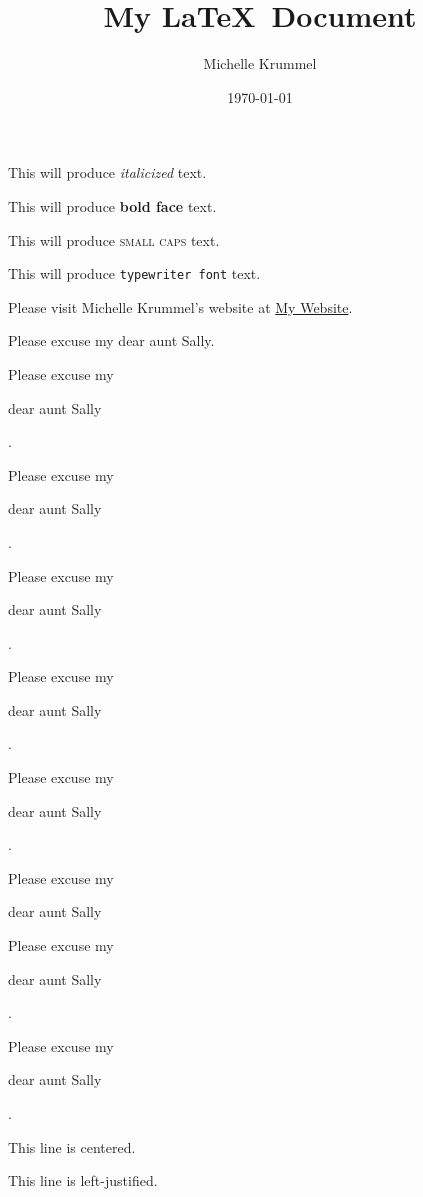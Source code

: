 \documentclass[11pt]{article}
\title{My \LaTeX\ Document}
\author{Michelle Krummel}
\date{\today}
\begin{document}
\tableofcontents
\maketitle

This will produce \textit{italicized} text.

This will produce \textbf{bold face} text.

This will produce \textsc{small caps} text.

This will produce \texttt{typewriter font} text.

Please visit Michelle Krummel's website at \href{http://michellekrummel.com}{My Website}.

\vspace{1cm}

Please excuse my dear aunt Sally.

Please excuse my \begin{large}dear aunt Sally\end{large}.

Please excuse my \begin{Large}dear aunt Sally\end{Large}.

Please excuse my \begin{huge}dear aunt Sally\end{huge}.

Please excuse my \begin{Huge}dear aunt Sally\end{Huge}.

Please excuse my \begin{normalsize}dear aunt Sally\end{normalsize}.

Please excuse my \begin{small}dear aunt Sally\end{small}

Please excuse my \begin{scriptsize}dear aunt Sally\end{scriptsize}.

Please excuse my \begin{tiny}dear aunt Sally\end{tiny}.

\vspace{1cm}

\begin{center}This line is centered.\end{center}

\begin{flushleft}This line is left-justified.\end{flushleft}
\end{document}

